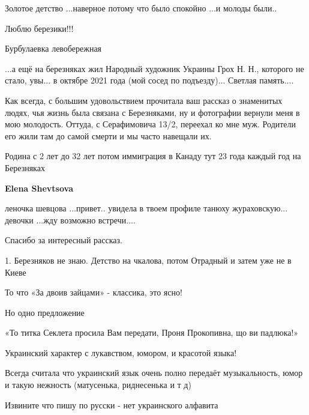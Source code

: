 \begin{itemize}
Золотое детство ...наверное потому что было спокойно ...и молоды были..

Люблю березики!!!

Бурбулаевка левобережная


...а ещё на березняках жил Народный художник Украины Грох Н. Н., которого не
стало, увы... в октябре 2021 года (мой сосед по подъезду)... Светлая память....


Как всегда, с большим удовольствием прочитала ваш рассказ о знаменитых людях,
чья жизнь была связана с Березняками, ну и фотографии вернули меня в мою
молодость. Оттуда, с Серафимовича 13/2, переехал ко мне муж. Родители его жили
там до самой смерти и мы часто навещали их.


Родина с 2 лет до 32 лет потом иммиграция в Канаду тут 23 года каждый год на
Березняках

\textbf{Elena Shevtsova} 

леночка шевцова ...привет.. увидела в твоем профиле танюху жураховскую... девочки
...жду возможно встречи....🍹🍨

Спасибо за интересный рассказ.


1. Березняков не знаю. Детство на чкалова, потом Отрадный и затем уже не в
Киеве

То что «За двоив зайцами» - классика, это ясно!

Но одно предложение

«То титка Секлета просила Вам передати, Проня Прокопивна, що ви падлюка!»

Украинский характер с лукавством, юмором, и красотой языка!

Всегда считала что украинский язык очень полно передаёт музыкальность, юмор и
такую нежность (матусенька, риднесенька и т д)

Извините что пишу по русски - нет украинского алфавита

\end{itemize} %
